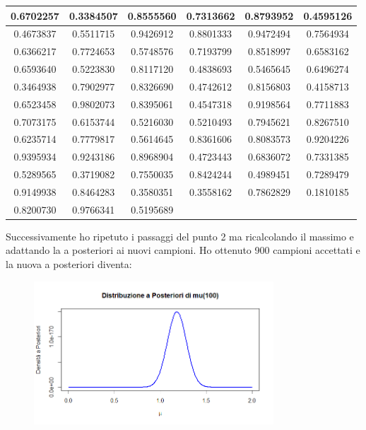 \documentclass[a4paper,12pt]{article}
\begin{document}
\begin{itemize}
\begin{center}
\begin{tabular}{|c|c|c|c|c|c|}
			\hline
			0.6702257 & 0.3384507 & 0.8555560 & 0.7313662 & 0.8793952 & 0.4595126 \\
			\hline
			0.4673837 & 0.5511715 & 0.9426912 & 0.8801333 & 0.9472494 & 0.7564934 \\
			\hline
			0.6366217 & 0.7724653 & 0.5748576 & 0.7193799 & 0.8518997 & 0.6583162 \\
			\hline
			0.6593640 & 0.5223830 & 0.8117120 & 0.4838693 & 0.5465645 & 0.6496274 \\
			\hline
			0.3464938 & 0.7902977 & 0.8326690 & 0.4742612 & 0.8156803 & 0.4158713 \\
			\hline
			0.6523458 & 0.9802073 & 0.8395061 & 0.4547318 & 0.9198564 & 0.7711883 \\
			\hline
			0.7073175 & 0.6153744 & 0.5216030 & 0.5210493 & 0.7945621 & 0.8267510 \\
			\hline
			0.6235714 & 0.7779817 & 0.5614645 & 0.8361606 & 0.8083573 & 0.9204226 \\
			\hline
			0.9395934 & 0.9243186 & 0.8968904 & 0.4723443 & 0.6836072 & 0.7331385 \\
			\hline
			0.5289565 & 0.3719082 & 0.7550035 & 0.8424244 & 0.4989451 & 0.7289479 \\
			\hline
			0.9149938 & 0.8464283 & 0.3580351 & 0.3558162 & 0.7862829 & 0.1810185 \\
			\hline
			0.8200730 & 0.9766341 & 0.5195689 & & & \\
			\hline
		\end{tabular}
	\end{center}
	Successivamente ho ripetuto i passaggi del punto 2 ma ricalcolando il massimo e adattando la a posteriori ai nuovi campioni.
	Ho ottenuto 900 campioni accettati e la nuova a posteriori diventa:
	\begin{figure}[h] %
		\centering %
		\includegraphics[width=0.8\textwidth]{newpost.png} %

\end{figure}
\end{itemize}
\end{document}
